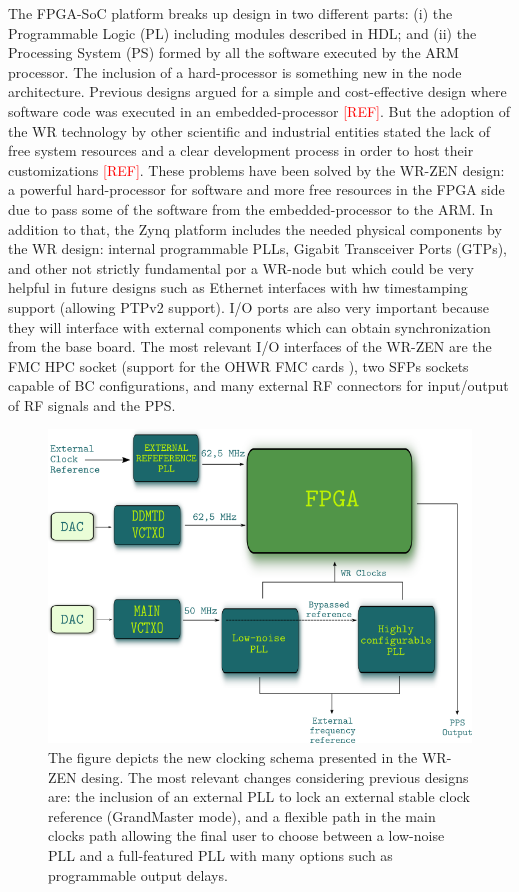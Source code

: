 The FPGA-SoC platform breaks up design in two different parts: (i) the 
Programmable Logic (PL) including modules described in HDL; and (ii) the 
Processing System (PS) formed by all the software executed by the ARM processor.
The inclusion of a hard-processor is something new in the node architecture. 
Previous designs argued for a simple and cost-effective design where software 
code was executed in an embedded-processor \textcolor{red}{[REF]}. But the adoption of the WR 
technology by other scientific and industrial entities stated the lack of free 
system resources and a clear development process in order to host their 
customizations \textcolor{red}{[REF]}. These problems have been solved by the WR-ZEN design: a 
powerful hard-processor for software and more free resources in the FPGA side 
due to pass some of the software from the embedded-processor to the ARM. In 
addition to that, the Zynq platform includes the needed physical components by 
the WR design: internal programmable PLLs, Gigabit Transceiver Ports (GTPs), 
and other not strictly fundamental por a WR-node but which could be very 
helpful in future designs such as Ethernet interfaces with hw timestamping 
support (allowing PTPv2 support). I/O ports are also very important because 
they will interface with external components which can obtain synchronization 
from the base board. The most relevant I/O interfaces of the WR-ZEN are the FMC 
HPC socket (support for the OHWR \cite{ohwr:repo} FMC cards 
\cite{ohwr:fmc-fine-delay}), two SFPs sockets capable of BC configurations, and 
many external RF connectors for input/output of RF signals and the PPS.

\begin{figure}
	\centering
	\includegraphics[width=0.7\linewidth]{img/zenclkschema}
	\caption[WR-ZEN clocking schema]{The figure depicts the new clocking schema 
		presented in the WR-ZEN desing. The most relevant changes considering 
		previous designs are: the inclusion of an external PLL to lock an 
		external 
		stable clock reference (GrandMaster mode), and a flexible path in the 
		main 
		clocks path allowing the final user to choose between a low-noise PLL 
		and a 
		full-featured PLL with many options such as programmable output delays.}
	\label{fig:zenclkschema}
\end{figure}

